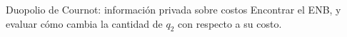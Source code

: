 \documentclass[12pt]{article}
\begin{document}
\begin{exbox}{Duopolio de Cournot: información privada sobre costos}
Encontrar el ENB, y evaluar cómo cambia la cantidad de $q_2$ con respecto a su costo. 














\end{exbox}
\end{document}
